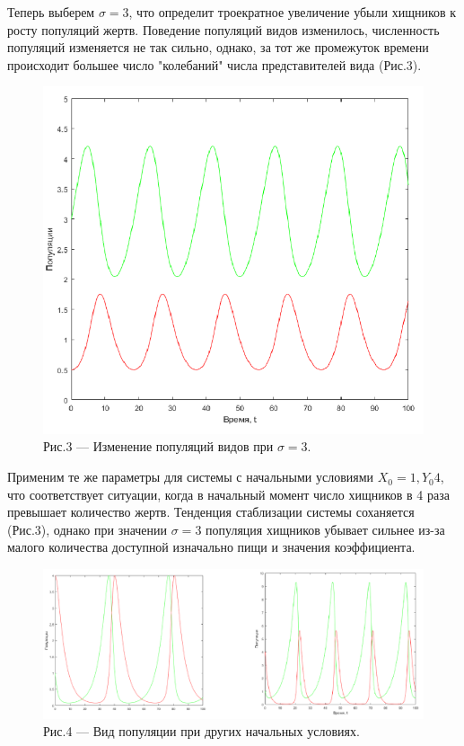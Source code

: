 \documentclass[a4paper,12pt]{article}
\begin{document}
Теперь выберем $\sigma = 3$, что определит троекратное увеличение убыли хищников
к росту популяций жертв. Поведение популяций видов изменилось, численность популяций изменяется не так сильно,
однако, за тот же промежуток времени происходит большее число "колебаний" числа представителей вида (Рис.3).
\begin{figure}[h]
    \centering
    \includegraphics[width=0.5\linewidth]{pictures/task2.png}
    \captionsetup{labelformat=empty}
    \caption{Рис.3 --- Изменение популяций видов при $\sigma = 3$.}
\end{figure}

Применим те же параметры для системы с начальными условиями $X_0 = 1, Y_0 4$, что соответствует 
ситуации, когда в начальный момент число хищников в 4 раза превышает количество жертв.
Тенденция стаблизации системы соханяется (Рис.3), однако при значении $\sigma = 3$ популяция 
хищников убывает сильнее из-за малого количества доступной изначально пищи и значения коэффициента.
\begin{figure}[h]
    \centering
    \includegraphics[width=1\linewidth]{pictures/task3.png}
    \captionsetup{labelformat=empty}
    \caption{Рис.4 --- Вид популяции при других начальных условиях.}
\end{figure}
\newpage
\end{document}
